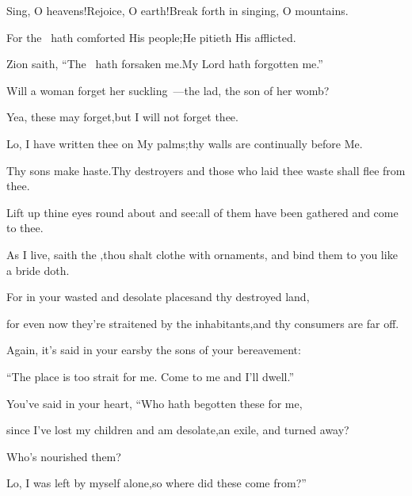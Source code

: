 
\begin{inparaenum}
  \pc{} Sing, O heavens!\pa{}Rejoice, O earth!\pa{}Break forth in singing, O mountains.%

  \pb{}For the \lord\ hath comforted His people;\pa{}He pitieth His afflicted.%

  \pa{} Zion saith, ``The \lord\ hath forsaken me.\pa{}My Lord hath forgotten me.''%

  \pa{} Will a woman forget her suckling~---\pa{}the lad, the son of her womb?%

  \pa{}Yea, these may forget,\pa{}but I will not forget thee.%

  \pa{} Lo, I have written thee on My palms;\pa{}thy walls are continually before Me.%

  \pa{} Thy sons make haste.\pa{}Thy destroyers and those who laid thee waste shall flee from thee.%

  \pa{} Lift up thine eyes round about and see:\pa{}all of them have been gathered and come to thee.%

  \pa{}As I live, saith the \lord,\pa{}thou shalt clothe  with ornaments, and bind them to you like a bride doth.%

  \pa{} For in your wasted and desolate places\pa{}and thy destroyed land,%

  \pa{}for even now they're straitened by the inhabitants,\pa{}and thy consumers are far off.%

  \pa{} Again, it's said in your ears\pa{}by the sons of your bereavement:%

  \pa{}``The place is too strait for me. Come to me and I'll dwell.''%

  \pa{} You've said in your heart, ``Who hath begotten these for me,%

  \pa{}since I've lost my children and am desolate,\pa{}an exile, and turned away?%

  \pa{}Who's nourished them?%

  \pa{}Lo, I was left by myself alone,\pa{}so where did these come from?''%
\end{inparaenum}
